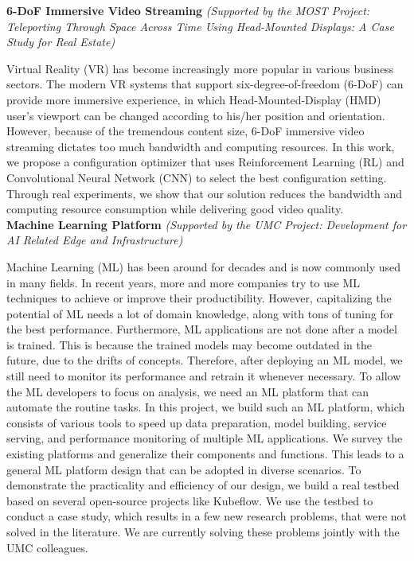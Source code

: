 {\bf 6-DoF Immersive Video Streaming} {\it (Supported by the MOST Project: Teleporting Through Space 
Across Time Using Head-Mounted Displays: A Case Study for Real Estate)} 

Virtual Reality (VR) has become increasingly more popular in various business sectors. 
The modern VR systems that support
six-degree-of-freedom (6-DoF) can provide more immersive experience, in which Head-Mounted-Display (HMD) user’s viewport can be changed
according to his/her position and orientation. However, because of the tremendous content size, 6-DoF immersive
video streaming dictates too much bandwidth and computing resources. In this work, we propose a configuration
optimizer that uses Reinforcement Learning (RL) and Convolutional Neural Network (CNN) to 
select the best configuration setting. Through real experiments, we show that our solution reduces the bandwidth and computing resource consumption while delivering
good video quality.\\

\vspace{5mm} %
{\bf Machine Learning Platform} {\it (Supported by the UMC Project: Development for AI Related Edge and Infrastructure)}

Machine Learning (ML) has been around for decades
and is now commonly used in many fields. 
In recent years, more and more companies try to use ML techniques to achieve or improve their
productibility. However, capitalizing the potential of ML needs a lot of domain knowledge, along with tons of tuning for the best performance.
Furthermore, ML applications are not done after a model is trained. This is because the trained models may become outdated in the future, due to the drifts of concepts. 
Therefore, after deploying an ML model, we still need to monitor its performance and retrain it whenever necessary.
To allow the ML developers to focus on analysis, we need an ML platform that can automate the routine tasks.
In this project, we build such an ML platform, which consists of various tools to speed up data preparation, model building, service serving, and performance monitoring of multiple ML applications.
We survey the existing platforms and generalize their components and functions.
This leads to a general ML platform design that can be adopted in diverse scenarios.
To demonstrate the practicality and efficiency of our design, we build a real testbed based on several open-source projects like Kubeflow.
We use the testbed to conduct a case study, which results in a few new research problems, that were not solved in the literature. We are currently solving these problems jointly with the UMC colleagues. \\

